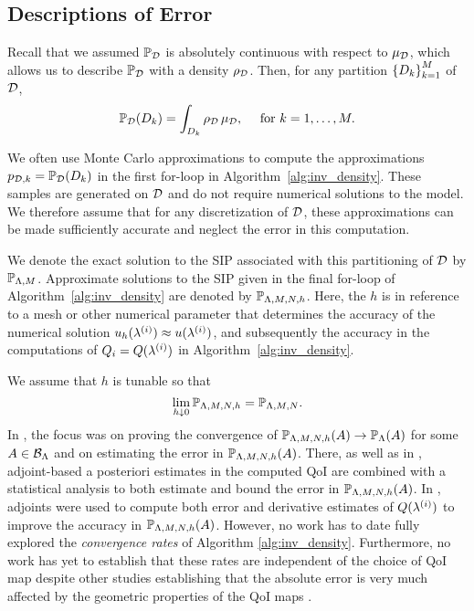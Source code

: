 \subsection{Descriptions of Error}\label{sec:set-error}
Recall that we assumed $\operatorname*{\mathbb{P}_{\mathcal{D}}}$ is absolutely continuous with respect to $\mu_{\mathcal{D}}$, which allows us to describe $\operatorname*{\mathbb{P}_{\mathcal{D}}}$ with a density $\rho_{\mathcal{D}}$. Then, for any partition $\left\{D_k\right\}_{k=1}^{M}$ of $\mathcal{D}$,
\[
\operatorname*{\mathbb{P}_{\mathcal{D}}} (D_k) = \int_{D_k} \rho_{\mathcal{D}} \, \mu_{\mathcal{D}}, \quad \text{ for } k = 1, \hdots, M.
\]

We often use Monte Carlo approximations to compute the approximations $p_{\mathcal{D}, k}=\operatorname*{\mathbb{P}_{\mathcal{D}}}(D_k)$ in the first for-loop in Algorithm~\ref{alg:inv_density}.
These samples are generated on $\mathcal{D}$ and do not require numerical solutions to the model.
We therefore assume that for any discretization of $\mathcal{D}$, these approximations can be made sufficiently accurate and neglect the error in this computation.

We denote the exact solution to the SIP associated with this partitioning of $\mathcal{D}$ by $\mathbb{P}_{{\Lambda}, M}$.
Approximate solutions to the SIP given in the final for-loop of Algorithm~\ref{alg:inv_density} are denoted by $\mathbb{P}_{{\Lambda}, M, N, h}$.
Here, the $h$ is in reference to a mesh or other numerical parameter that determines the accuracy of the numerical solution $u_h(\lambda^{(i)})\approx u(\lambda^{(i)})$, and subsequently the accuracy in the computations of $Q_i = Q(\lambda^{(i)})$ in Algorithm~\ref{alg:inv_density}.

We assume that $h$ is tunable so that
\[
\lim\limits_{h \downarrow 0} \mathbb{P}_{{\Lambda}, M, N, h} = \mathbb{P}_{{\Lambda}, M, N}.
\]
In \cite{BM17}, the focus was on proving the convergence of $\mathbb{P}_{{\Lambda}, M, N, h} (A) \to \operatorname*{\mathbb{P}_{{\Lambda}}} (A)$ for some $A\in \mathcal{B}_{{\Lambda}}$ and on estimating the error in $\mathbb{P}_{{\Lambda}, M, N, h}(A)$.
There, as well as in \cite{BGE+15}, adjoint-based a posteriori estimates in the computed QoI are combined with a statistical analysis to both estimate and bound the error in $\mathbb{P}_{{\Lambda}, M, N, h} (A)$.
In \cite{BM17}, adjoints were used to compute both error and derivative estimates of $Q(\lambda^{(i)})$ to improve the accuracy in $\mathbb{P}_{{\Lambda}, M, N, h} (A)$.
However, no work has to date fully explored the \emph{convergence rates} of Algorithm \ref{alg:inv_density}.
Furthermore, no work has yet to establish that these rates are independent of the choice of QoI map despite other studies establishing that the absolute error is very much affected by the geometric properties of the QoI maps \cite{BE13}.

